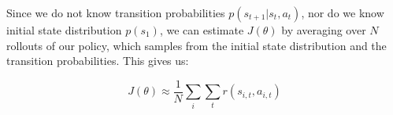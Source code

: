 \documentclass[11pt]{article} %
\begin{document}
Since we do not know transition probabilities $p(s_{t+1}|s_t, a_t)$, nor do we know initial state distribution $p(s_1)$, we can estimate $J(\theta)$ by averaging over $N$ rollouts of our policy, which samples from the initial state distribution and the transition probabilities. This gives us: 

\begin{equation}\label{eq:objective_funct}
    J(\theta) \approx \frac{1}{N}\sum_i\sum_t r(s_{i,t}, a_{i,t})
\end{equation}


\newpage


\end{document}
